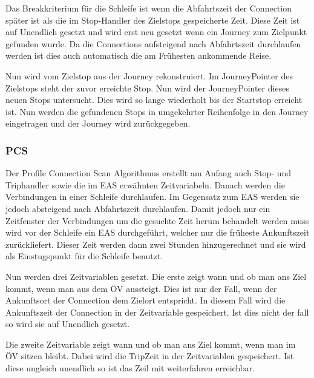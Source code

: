 Das Breakkriterium für die Schleife ist wenn die Abfahrtszeit der Connection später ist als die im Stop-Handler des Zielstops gespeicherte Zeit. Diese Zeit ist auf Unendlich gesetzt und wird erst neu gesetzt wenn ein Journey zum Zielpunkt gefunden wurde. Da die Connections aufsteigend nach Abfahrtszeit durchlaufen werden ist dies auch automatisch die am Frühesten ankommende Reise. 
\newline


Nun wird vom Zielstop aus der Journey rekonstruiert. Im JourneyPointer des Zielstops steht der zuvor erreichte Stop. Nun wird der JourneyPointer dieses neuen Stops untersucht. Dies wird so lange wiederholt bis der Startstop erreicht ist. Nun werden die gefundenen Stops in umgekehrter Reihenfolge in den Journey eingetragen und der Journey wird zurückgegeben.
\subsubsection{PCS}
Der Profile Connection Scan Algorithmus erstellt am Anfang auch Stop- und Triphandler sowie die im EAS erwähnten Zeitvariabeln. Danach werden die Verbindungen in einer Schleife durchlaufen. Im Gegensatz zum EAS werden sie jedoch absteigend nach Abfahrtszeit durchlaufen. Damit jedoch nur ein Zeitfenster der Verbindungen um die gesuchte Zeit herum behandelt werden muss wird vor der Schleife ein EAS durchgeführt, welcher nur die früheste Ankunftszeit zurückliefert. Dieser Zeit werden dann zwei Stunden hinzugerechnet und sie wird als Einstugspunkt für die Schleife benutzt. 
\newline


Nun werden drei Zeitvariablen gesetzt. Die erste zeigt wann und ob man ans Ziel kommt, wenn man aus dem ÖV aussteigt. Dies ist nur der Fall, wenn der Ankunftsort der Connection dem Zielort entspricht. In diesem Fall wird die Ankunftszeit der Connection in der Zeitvariable gespeichert. Ist dies nicht der fall so wird sie auf Unendlich gesetzt.
\newline


Die zweite Zeitvariable zeigt wann und ob man ans Ziel kommt, wenn man im ÖV sitzen bleibt. Dabei wird die TripZeit in der Zeitvariablen gespeichert. Ist diese ungleich unendlich so ist das Zeil mit weiterfahren erreichbar.
\newline


